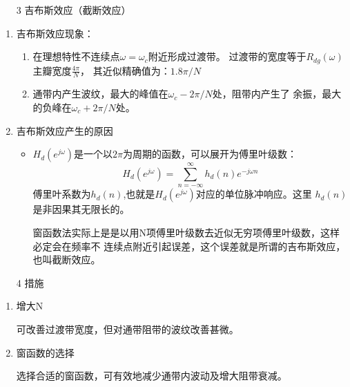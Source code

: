 \documentclass[notheorems,compress,mathserif,table]{beamer}
\begin{document}
\begin{frame}[allowframebreaks]\frametitle{}%
\begin{enumerate}
\item [3] 吉布斯效应（截断效应）
\end{enumerate}
      \begin{enumerate}
      \item  吉布斯效应现象：\par
          \begin{enumerate}
            \item
                在理想特性不连续点$\omega=\omega_c$附近形成过渡带。 过渡带的宽度等于$R_{dg}(\omega)$主瓣宽度$\frac{4\pi}{N}$，
                其近似精确值为：$1.8\pi/N$
            \item
                通带内产生波纹，最大的峰值在$\omega_c-2\pi/N$处，阻带内产生了
                余振，最大的负峰在$\omega_c+2\pi/N$处。
          \end{enumerate}
      \item 吉布斯效应产生的原因
          \begin{itemize}
            \item
            $H_d(e^{j\omega})$是一个以$2\pi$为周期的函数，可以展开为傅里叶级数：
                   $$H_d(e^{j\omega}) = \sum_{n=-\infty}^{\infty}h_d(n)e^{-j\omega n}$$
                  傅里叶系数为$h_d(n)$,也就是$H_d(e^{j\omega})$对应的单位脉冲响应。这里
                  $h_d(n)$是非因果其无限长的。\par

                  窗函数法实际上是是以用N项傅里叶级数去近似无穷项傅里叶级数，这样必定会在频率不
                  连续点附近引起误差，这个误差就是所谓的吉布斯效应，也叫截断效应。
          \end{itemize}
      \end{enumerate}
\begin{enumerate}
\newpage
 \item [4] 措施
\end{enumerate}


    \begin{enumerate}
      \item 增大N

          可改善过渡带宽度，但对通带阻带的波纹改善甚微。

      \item 窗函数的选择

          选择合适的窗函数，可有效地减少通带内波动及增大阻带衰减。
    \end{enumerate}


\end{frame}
\end{document}
